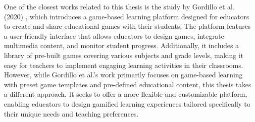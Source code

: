 One of the closest works related to this thesis is the study by Gordillo et al. (2020) \cite{sgame2020}, which introduces a game-based learning platform designed for educators to create and share educational games with their students. The platform features a user-friendly interface that allows educators to design games, integrate multimedia content, and monitor student progress. Additionally, it includes a library of pre-built games covering various subjects and grade levels, making it easy for teachers to implement engaging learning activities in their classrooms. However, while Gordillo et al.’s work primarily focuses on game-based learning with preset game templates and pre-defined educational content, this thesis takes a different approach. It seeks to offer a more flexible and customizable platform, enabling educators to design gamified learning experiences tailored specifically to their unique needs and teaching preferences.